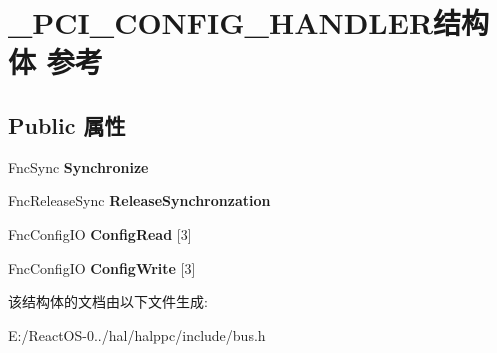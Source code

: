 \hypertarget{struct___p_c_i___c_o_n_f_i_g___h_a_n_d_l_e_r}{}\section{\+\_\+\+P\+C\+I\+\_\+\+C\+O\+N\+F\+I\+G\+\_\+\+H\+A\+N\+D\+L\+E\+R结构体 参考}
\label{struct___p_c_i___c_o_n_f_i_g___h_a_n_d_l_e_r}
\subsection*{Public 属性}
\begin{DoxyCompactItemize}
\item 
\mbox{\label{struct___p_c_i___c_o_n_f_i_g___h_a_n_d_l_e_r_add281dab78053a06f16e161040c220d8}} 
Fnc\+Sync {\bfseries Synchronize}
\item 
\mbox{\label{struct___p_c_i___c_o_n_f_i_g___h_a_n_d_l_e_r_a9475c00760a16e239af0a64ebfedbf66}} 
Fnc\+Release\+Sync {\bfseries Release\+Synchronzation}
\item 
\mbox{\label{struct___p_c_i___c_o_n_f_i_g___h_a_n_d_l_e_r_a57e6f40ea7a68829e55e9cf9f8fa3a3b}} 
Fnc\+Config\+IO {\bfseries Config\+Read} \mbox{[}3\mbox{]}
\item 
\mbox{\label{struct___p_c_i___c_o_n_f_i_g___h_a_n_d_l_e_r_a2d34d85110a1a19ef10938bde7f554e3}} 
Fnc\+Config\+IO {\bfseries Config\+Write} \mbox{[}3\mbox{]}
\end{DoxyCompactItemize}


该结构体的文档由以下文件生成\+:\begin{DoxyCompactItemize}
\item 
E\+:/\+React\+O\+S-\/0../hal/halppc/include/bus.\+h\end{DoxyCompactItemize}
